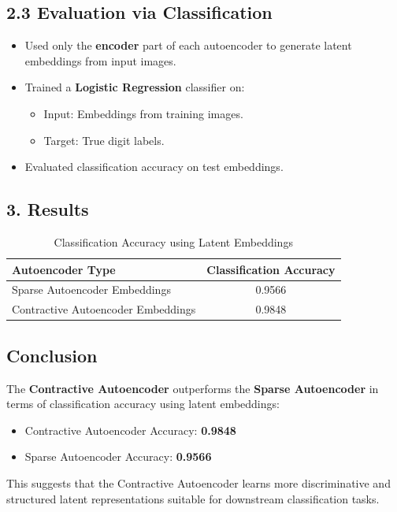 \documentclass[12pt]{article}
\begin{document}
\subsection*{2.3 Evaluation via Classification}
\begin{itemize}
    \item Used only the \textbf{encoder} part of each autoencoder to generate latent embeddings from input images.
    \item Trained a \textbf{Logistic Regression} classifier on:
    \begin{itemize}
        \item Input: Embeddings from training images.
        \item Target: True digit labels.
    \end{itemize}
    \item Evaluated classification accuracy on test embeddings.
\end{itemize}

\subsection*{3. Results}

\begin{table}
\centering
\begin{tabular}{lc}
\toprule
\textbf{Autoencoder Type} & \textbf{Classification Accuracy} \\
\midrule
Sparse Autoencoder Embeddings & 0.9566 \\
Contractive Autoencoder Embeddings & 0.9848 \\
\bottomrule
\end{tabular}
\caption{Classification Accuracy using Latent Embeddings}
\end{table}

\subsection*{Conclusion}
The \textbf{Contractive Autoencoder} outperforms the \textbf{Sparse Autoencoder} in terms of classification accuracy using latent embeddings:
\begin{itemize}
    \item Contractive Autoencoder Accuracy: \textbf{0.9848}
    \item Sparse Autoencoder Accuracy: \textbf{0.9566}
\end{itemize}

This suggests that the Contractive Autoencoder learns more discriminative and structured latent representations suitable for downstream classification tasks.
\end{document}
